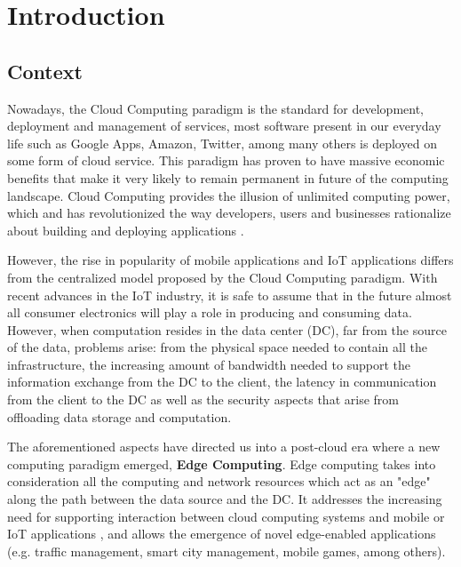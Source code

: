 \newcommand{\novathesis}{\emph{novathesis}}
\newcommand{\novathesisclass}{\texttt{novathesis.cls}}



\chapter{Introduction}
\label{cha:introduction}

\section{Context}

Nowadays, the Cloud Computing paradigm is the standard for development, deployment and management of services, most software present in our everyday life such as Google Apps, Amazon, Twitter, among many others is deployed on some form of cloud service. This paradigm has proven to have massive economic benefits that make it very likely to remain permanent in future of the computing landscape. Cloud Computing provides the illusion of unlimited computing power, which and has revolutionized the way developers, users and businesses rationalize about building and deploying applications \cite{10.1145/1721654.1721672}.

However, the rise in popularity of mobile applications and IoT applications differs from the centralized model proposed by the Cloud Computing paradigm. With recent advances in the IoT industry, it is safe to assume that in the future almost all consumer electronics will play a role in producing and consuming data. However, when computation resides in the data center (DC), far from the source of the data, problems arise: from the physical space needed to contain all the infrastructure, the increasing amount of bandwidth needed to support the information exchange from the DC to the client, the latency in communication from the client to the DC as well as the security aspects that arise from offloading data storage and computation.

The aforementioned aspects have directed us into a post-cloud era where a new computing paradigm emerged, \textbf{Edge Computing}. Edge computing takes into consideration all the computing and network resources which act as an "edge" along the path between the data source and the DC. It addresses the increasing need for supporting interaction between cloud computing systems and mobile or IoT applications \cite{iot_journal_shi_weisong_and_cao}, and allows the emergence of novel edge-enabled applications (e.g. traffic management, smart city management, mobile games, among others).

